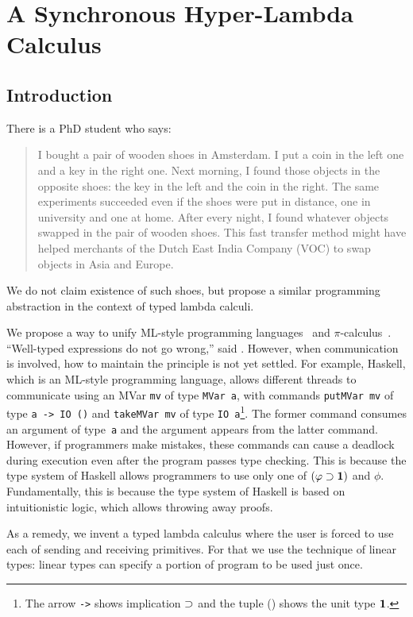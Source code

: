 \chapter{A Synchronous Hyper-Lambda Calculus}
\label{ch:exchange}

\section{Introduction}

There is a PhD student who says:
\begin{quotation}
 I bought a pair of wooden shoes in Amsterdam.  I put
 a coin in the left one and a key in the right one.
 Next morning, I found those objects in the opposite shoes:
 the key in the left and the coin in the right.
 The same experiments succeeded even if the shoes were put in distance, one in
 university and one at home.  After every night, I found whatever objects swapped in
 the pair of wooden shoes.
 This fast transfer method might have helped merchants of
 the Dutch East India Company (VOC) to swap objects in Asia and Europe.
\end{quotation}
We do not claim existence of such shoes, but propose
a similar programming abstraction in the context of typed lambda calculi.

We propose a way to unify ML-style programming
languages~\citep{milner1997definition, marlow2010haskell} and
$\pi$-calculus~\citep{milner1999communicating}.
``Well-typed expressions do not go wrong,'' said \citet{milner1978}.
However, when communication is involved, how to maintain the principle
is not yet settled.
For example, Haskell, which is an ML-style programming language,
allows different threads to communicate using an MVar \texttt{mv} of
type \texttt{MVar
a}, with commands
\texttt{putMVar mv} of type \texttt{a -> IO ()} and \texttt{takeMVar mv}
of type \texttt{IO
a}\footnote{The arrow \texttt{->} shows implication $\supset$ and the tuple
() shows the unit type $\mathbf{1}$.}.
The former command consumes an argument of type~\texttt{a} and
the argument appears from the latter command.
However, if programmers make mistakes, these commands can
cause a deadlock during execution even after the program passes type
checking.
This is because the type system of Haskell allows programmers to
use only one of $(\varphi\supset \mathbf{1})$ and $\phi$.
Fundamentally, this is because the type system of Haskell
is based on intuitionistic logic, which allows throwing away proofs.

As a remedy, we invent a typed lambda calculus where
the user is forced to use each of sending and receiving primitives.
For that we use the technique of linear types:
linear types can specify a portion of program to be used
just once.

